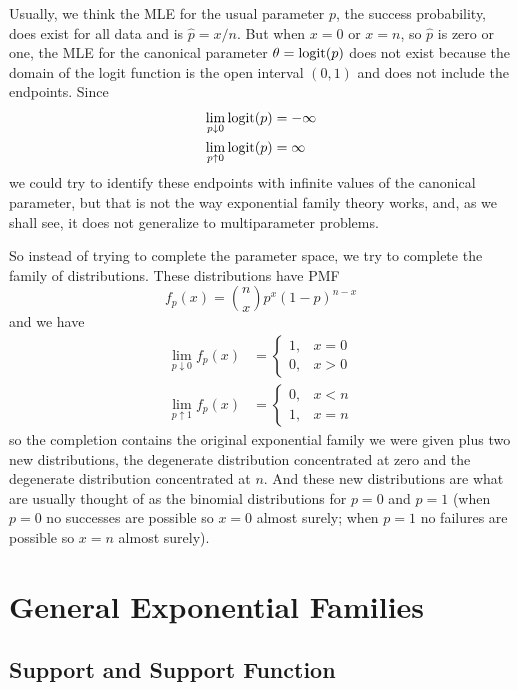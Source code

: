 Usually, we think the MLE for the usual parameter $p$, the success probability,
does exist for all data and is $\hat{p} = x / n$.  But when $x = 0$ or $x = n$,
so $\hat{p}$ is zero or one, the MLE for the canonical parameter
$\theta = \operatorname{logit}(p)$
does not exist because the domain of the logit function is the open interval
$(0, 1)$ and does not include the endpoints.  Since
\begin{align*}
   \lim_{p \downarrow 0} \operatorname{logit}(p) & = - \infty
   \\
   \lim_{p \uparrow 0} \operatorname{logit}(p) & = \infty
\end{align*}
we could try to identify these endpoints with infinite values of the canonical
parameter, but that is not the way exponential family theory works,
and, as we shall see, it does not generalize to multiparameter problems.

So instead of trying to complete the parameter space, we try to complete the
family of distributions.  These distributions have PMF
$$
   f_p(x) = \binom{n}{x} p^x (1 - p)^{n - x}
$$
and we have
\begin{align*}
   \lim_{p \downarrow 0} f_p(x) & = \begin{cases} 1, & x = 0 \\ 0, & x > 0
   \end{cases}
   \\
   \lim_{p \uparrow 1} f_p(x) & = \begin{cases} 0, & x < n \\ 1, & x = n
   \end{cases}
\end{align*}
so the completion contains the original exponential family we were given
plus two new distributions, the degenerate distribution concentrated at zero
and the degenerate distribution concentrated at $n$.  And these new
distributions are what are usually thought of as the binomial distributions
for $p = 0$ and $p = 1$ (when $p = 0$ no successes are possible so $x = 0$
almost surely; when $p = 1$ no failures are possible so $x = n$ almost surely).

\section{General Exponential Families}

\subsection{Support and Support Function}

